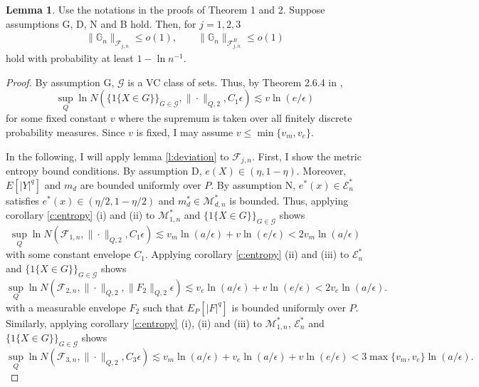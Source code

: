 \documentclass[12pt,oneside,reqno,english]{amsart}
\theoremstyle{definition}
\newtheorem{lemma}{Lemma}
\begin{document}
\begin{lemma}\label{l:residual}
Use the notations in the proofs of Theorem 1 and 2. 
Suppose assumptions G, D, N and B hold. 
Then, for $j=1,2,3$
\begin{align*}
\|\mathbb{G}_{n}\|_{\mathcal{F}_{j,n}}\leq o(1), \qquad \|\mathbb{G}_{n}\|_{\mathcal{F}_{j,n}^{B}}\leq o(1)  
\end{align*}
hold with probability at least $1-\ln n^{-1}$. 
\begin{proof}
By assumption G, $\mathcal{G}$ is a VC class of sets. Thus, by Theorem 2.6.4 in \cite{VW:96}, 
\[\sup_{Q}\ln N(\{1\{X\in G\}\}_{G\in \mathcal{G}},\|\cdot\|_{Q,2},C_{1}\epsilon)\lesssim  v\ln(e/\epsilon)\]
for some fixed constant $v$ where the supremum is taken over all finitely discrete probability measures.
Since $v$ is fixed, I may assume $v\leq \min\{v_{m},v_{e}\}$. 

In the following, I will apply lemma \ref{l:deviation} to $\mathcal{F}_{j,n}$. 
First, I show the metric entropy bound conditions. 
By assumption D, $e(X)\in (\eta,1-\eta)$. Moreover, $E[|Y|^{q}]$ and $m_{d}$ are bounded uniformly over $P$. 
By assumption N,  $e^{*}(x)\in \mathcal{E}^{*}_{n}$ satisfies $e^{*}(x)\in (\eta/2,1-\eta/2)$ and $m^{*}_{d}\in \mathcal{M}^{*}_{d,n}$ is bounded.
Thus, applying corollary \ref{c:entropy} (i) and (ii) to $\mathcal{M}^{*}_{1,n}$ and $\{1\{X\in G\}\}_{G\in \mathcal{G}}$ shows 
\[\sup_{Q}\ln N(\mathcal{F}_{1,n},\|\cdot\|_{Q,2},C_{1}\epsilon)\lesssim  v_{m}\ln(a/\epsilon)+v\ln(e/\epsilon)< 2v_{m}\ln(a/\epsilon)\]
with some constant envelope $C_{1}$. Applying corollary \ref{c:entropy} (ii) and (iii) to $\mathcal{E}^{*}_{n}$ and $\{1\{X\in G\}\}_{G\in \mathcal{G}}$ shows 
\[\sup_{Q}\ln N(\mathcal{F}_{2,n},\|\cdot \|_{Q,2},\|F_{2}\|_{Q,2}\epsilon)\lesssim v_{e}\ln(a/\epsilon)+v\ln(e/\epsilon)< 2v_{e}\ln(a/\epsilon).\]
with a measurable envelope $F_{2}$ such that $E_{P}[|F|^{q}]$ is bounded uniformly over $P$. Similarly, applying corollary \ref{c:entropy} (i), (ii) and (iii) 
to $\mathcal{M}^{*}_{1,n}$, $\mathcal{E}^{*}_{n}$ and $\{1\{X\in G\}\}_{G\in \mathcal{G}}$ shows
\[\sup_{Q}\ln N(\mathcal{F}_{3,n},\|\cdot\|_{Q,2},C_{3}\epsilon )\lesssim v_{m}\ln(a/\epsilon)+v_{e}\ln(a/\epsilon)+v\ln(e/\epsilon)< 3\max\{v_{m},v_{e}\}\ln(a/\epsilon).\]


\end{proof}
\end{lemma}
\end{document}
